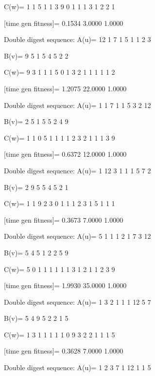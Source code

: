 C(w)=
     1     1     5     1     1     3     9     0     1     1     1     3     1     2     2     1

[time gen fitness]=
    0.1534    3.0000    1.0000

Double digest sequence:
A(u)=
    12     1     7     1     5     1     1     2     3

B(v)=
     9     5     1     5     4     5     2     2

C(w)=
     9     3     1     1     1     5     0     1     3     2     1     1     1     1     1     2

[time gen fitness]=
    1.2075   22.0000    1.0000

Double digest sequence:
A(u)=
     1     1     7     1     1     5     3     2    12

B(v)=
     2     5     1     5     5     2     4     9

C(w)=
     1     1     0     5     1     1     1     1     2     3     2     1     1     1     3     9

[time gen fitness]=
    0.6372   12.0000    1.0000

Double digest sequence:
A(u)=
     1    12     3     1     1     1     5     7     2

B(v)=
     2     9     5     5     4     5     2     1

C(w)=
     1     1     9     2     3     0     1     1     1     2     3     1     5     1     1     1

[time gen fitness]=
    0.3673    7.0000    1.0000

Double digest sequence:
A(u)=
     5     1     1     1     2     1     7     3    12

B(v)=
     5     4     5     1     2     2     5     9

C(w)=
     5     0     1     1     1     1     1     1     3     1     2     1     1     2     3     9

[time gen fitness]=
    1.9930   35.0000    1.0000

Double digest sequence:
A(u)=
     1     3     2     1     1     1    12     5     7

B(v)=
     5     4     9     5     2     2     1     5

C(w)=
     1     3     1     1     1     1     1     0     9     3     2     2     1     1     1     5

[time gen fitness]=
    0.3628    7.0000    1.0000

Double digest sequence:
A(u)=
     1     2     3     7     1    12     1     1     5

